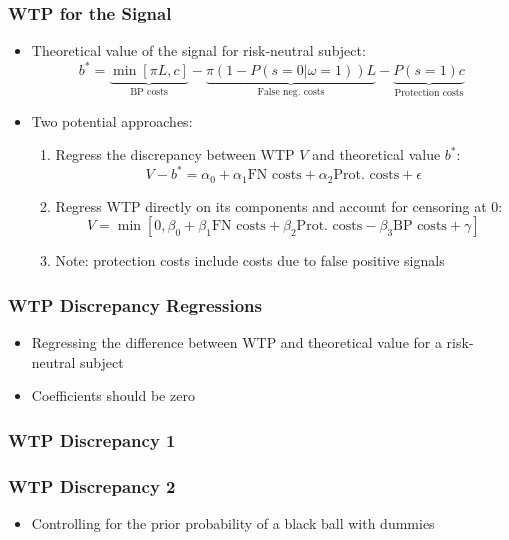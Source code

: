 \documentclass[11pt,hyperref={bookmarks=false}]{beamer}
\begin{document}
\begin{frame}
\frametitle{WTP for the Signal}
\begin{itemize}
\item Theoretical value of the signal for risk-neutral subject:
$$b^*=\underbrace{\min[\pi L,c]}_{\text{BP costs}}-\underbrace{\pi(1-P(s=0|\omega=1))L}_{\text{False neg. costs}}-\underbrace{P(s=1)c}_{\text{Protection costs}}$$
\item Two potential approaches:
\begin{enumerate}
\item Regress the discrepancy between WTP $V$ and theoretical value $b^*$:
$$V-b^*=\alpha_0+\alpha_1\text{FN costs}+\alpha_2 \text{Prot. costs}+\epsilon$$
\item Regress WTP directly on its components and account for censoring at 0:
$$V=\min[0,\beta_0+\beta_1\text{FN costs}+\beta_2 \text{Prot. costs}-\beta_3\text{BP costs}+\gamma]$$
\item Note: protection costs include costs due to false positive signals
\end{enumerate}
\end{itemize}
\end{frame}


\begin{frame}
\frametitle{WTP Discrepancy Regressions}
\Large
\begin{itemize}
\item Regressing the difference between WTP and theoretical value for a risk-neutral subject
\item Coefficients should be zero
\end{itemize}
\normalsize
\end{frame}





\begin{frame}
\frametitle{WTP Discrepancy 1}

\footnotesize

\normalsize
\end{frame}


\begin{frame}
\frametitle{WTP Discrepancy 2}
\begin{itemize}
\item Controlling for the prior probability of a black ball with dummies
\end{itemize}
\footnotesize

\normalsize
\end{frame}
\end{document}
